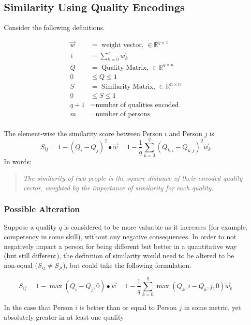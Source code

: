 \subsection{Similarity Using Quality Encodings}

Consider the following definitions.

\begin{align}
\vec{w} &= \text{ weight vector, } \in \mathbb{R}^{q \times 1} \\
1 &= \sum_{k=0}^{q} \vec{w}_k\\
Q &= \text{ Quality Matrix, } \in \mathbb{R}^{q \times n} \\
0 & \leq Q \leq 1 \\
S &= \text{ Similarity Matrix, } \in \mathbb{R}^{n \times n} \\
0 & \leq S \leq 1 \\
q + 1 &= \text{number of qualities encoded}\\
m &= \text{number of persons}\\
\end{align}

The element-wise the similarity score between Person $i$ and Person $j$ is
\[S_{ij} = 1- (Q_i - Q_j)^2\bullet \vec{w} =  1 - \frac{1}{q}\sum_{k=0}^{q} (Q_{k,i} - Q_{k,j})^2\vec{w}_k\]
In words:
\begin{quote}
\textit{The similarity of two people is the square distance of their encoded quality vector, weighted by the importance of similarity for each quality.}
\end{quote}

\subsubsection{Possible Alteration}

Suppose a quality $q$ is considered to be more valuable as it increases (for example, competency in some skill), without any negative consequences. In order to not negatively impact a person for being different but better in a quantitative way (but still different), the definition of similarity would need to be altered to be non-equal ($S_{ij} \neq S_{ji}$), but could take the following formulation.

\[S_{ij} = 1- \max(Q_i - Q_j, 0) \bullet \vec{w} =  1 - \frac{1}{q}\sum_{k=0}^{q} \max(Q_k,i - Q_k,j, 0)\vec{w}_k\]

In the case that Person $i$ is better than or equal to Person $j$ in some metric, yet absolutely greater in at least one quality

